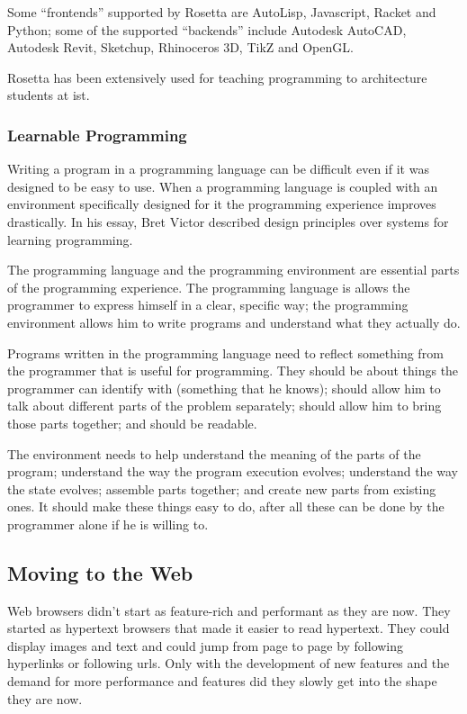 \documentclass{./llncs2e/llncs}
\begin{document}
	Some ``frontends'' supported by Rosetta are AutoLisp, Javascript, Racket and Python; some of the supported ``backends'' include Autodesk AutoCAD, Autodesk Revit, Sketchup, Rhinoceros 3D, TikZ and OpenGL.
	
	Rosetta has been extensively used for teaching programming to architecture students at \ac{ist}. 

\subsubsection{Learnable Programming\cite{victor2012learnable}}
	Writing a program in a programming language can be difficult even if it was designed to be easy to use. 
	When a programming language is coupled with an environment specifically designed for it the programming experience improves drastically. 
	In his essay\cite{victor2012learnable}, Bret Victor described design principles over systems for learning programming.
	
	The programming language and the programming environment are essential parts of the programming experience.
	The programming language is allows the programmer to express himself in a clear, specific way; the programming environment allows him to write programs and understand what they actually do.
	
	Programs written in the programming language need to reflect something from the programmer that is useful for programming.
	They should be about things the programmer can identify with (something that he knows); should allow him to talk about different parts of the problem separately; should allow him to bring those parts together; and should be readable.
	
	The environment needs to help understand the meaning of the parts of the program; understand the way the program execution evolves; understand the way the state evolves; assemble parts together; and create new parts from existing ones.
	It should make these things easy to do, after all these can be done by the programmer alone if he is willing to.

\subsection{Moving to the Web}
	Web browsers didn't start as feature-rich and performant as they are now.
	They started as hypertext browsers that made it easier to read hypertext.
	They could display images and text and could jump from page to page by following hyperlinks or following \ac{url}s.
	Only with the development of new features and the demand for more performance and features did they slowly get into the shape they are now.
\end{document}
